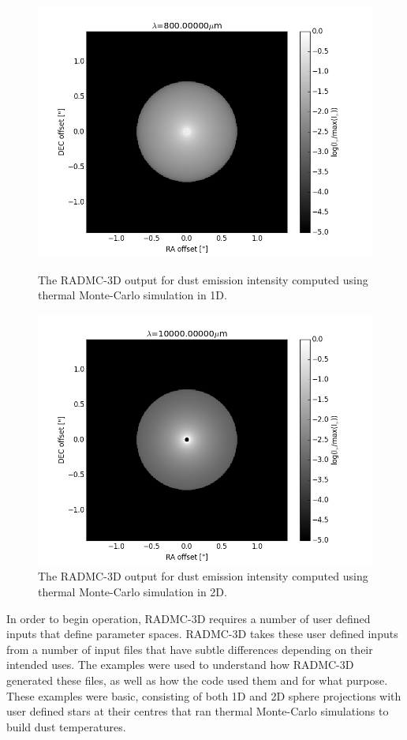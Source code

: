 \documentclass{report}
\begin{document}
\begin{figure}[!htb]
  \includegraphics[width=\linewidth]{../img/1d}
  \caption{The RADMC-3D output for dust emission intensity computed using thermal Monte-Carlo simulation in 1D.}\label{fig:1d}
\endminipage\hfill
{}
  \includegraphics[width=\linewidth]{../img/2d}
  \caption{The RADMC-3D output for dust emission intensity computed using thermal Monte-Carlo simulation in 2D.}\label{fig:2d}
\endminipage
\end{figure}

In order to begin operation, RADMC-3D requires a number of user defined inputs that define parameter spaces. RADMC-3D takes these user defined inputs from a number of input files that have subtle differences depending on their intended uses. The examples were used to understand how RADMC-3D generated these files, as well as how the code used them and for what purpose. These examples were basic, consisting of both 1D and 2D sphere projections with user defined stars at their centres that ran thermal Monte-Carlo simulations to build dust temperatures.
\end{document}
